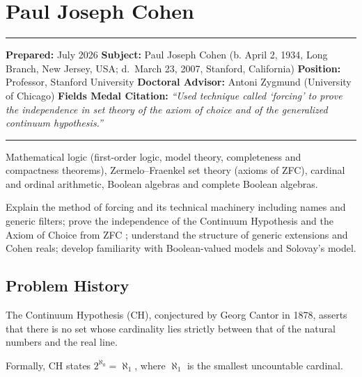 \chapter{Paul Joseph Cohen}
\label{ch1966pauljosephcohen:paul-joseph-cohen-fields-medal-1966-a-comprehensive-report}

\begin{center}\rule{0.5\linewidth}{0.5pt}\end{center}

\textbf{Prepared:} July 2026
\textbf{Subject:} Paul Joseph Cohen (b. April 2, 1934, Long Branch, New Jersey, USA; d.~March 23, 2007, Stanford, California)
\textbf{Position:} Professor, Stanford University
\textbf{Doctoral Advisor:} Antoni Zygmund (University of Chicago)
\textbf{Fields Medal Citation:} \emph{``Used technique called `forcing' to prove the independence in set theory of the axiom of choice and of the generalized continuum hypothesis.''}

\begin{center}\rule{0.5\linewidth}{0.5pt}\end{center}

\begin{prereqs}
Mathematical logic (first-order logic, model theory, completeness and compactness theorems), Zermelo--Fraenkel set theory (axioms of ZFC), cardinal and ordinal arithmetic, Boolean algebras and complete Boolean algebras.
\end{prereqs}

\begin{objectives}
Explain the method of forcing and its technical machinery including names and generic filters; prove the independence of the Continuum Hypothesis and the Axiom of Choice from ZFC \cite{cohen1963}; understand the structure of generic extensions and Cohen reals; develop familiarity with Boolean-valued models and Solovay's model.
\end{objectives}

\section{Problem History}

The Continuum Hypothesis (CH), conjectured by Georg Cantor in 1878, asserts that there is no set whose cardinality lies strictly between that of the natural numbers and the real line.

Formally, CH states $2^{\aleph_0} = \aleph_1$, where $\aleph_1$ is the smallest uncountable cardinal.

